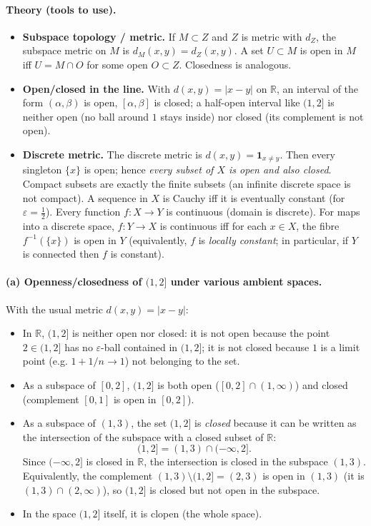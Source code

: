 \documentclass[12pt,a4paper]{article}
\theoremstyle{plain}
\theoremstyle{definition}
\theoremstyle{remark}
\theoremstyle{remark}
\begin{document}
\paragraph{Theory (tools to use).}
\begin{itemize}
	\item \textbf{Subspace topology / metric.}
	If $M\subset Z$ and $Z$ is metric with $d_Z$, the subspace metric on $M$ is
	$d_M(x,y)=d_Z(x,y)$. A set $U\subset M$ is open in $M$ iff $U=M\cap O$ for some open $O\subset Z$.
	Closedness is analogous.
	
	\item \textbf{Open/closed in the line.}
	With $d(x,y)=|x-y|$ on $\mathbb R$, an interval of the form $(\alpha,\beta)$ is open, $[\alpha,\beta]$ is closed; a half-open interval like $(1,2]$ is neither open (no ball around $1$ stays inside) nor closed (its complement is not open).
	
	\item \textbf{Discrete metric.}
	The discrete metric is $d(x,y)=\mathbf 1_{x\ne y}$. Then every singleton $\{x\}$ is open; hence \emph{every subset of $X$ is open and also closed}. Compact subsets are exactly the finite subsets (an infinite discrete space is not compact). A sequence in $X$ is Cauchy iff it is eventually constant (for $\varepsilon=\tfrac12$). Every function $f:X\to Y$ is continuous (domain is discrete). For maps into a discrete space, $f:Y\to X$ is continuous iff for each $x\in X$, the fibre $f^{-1}(\{x\})$ is open in $Y$ (equivalently, $f$ is \emph{locally constant}; in particular, if $Y$ is connected then $f$ is constant).
\end{itemize}

\paragraph{(a) Openness/closedness of $(1,2]$ under various ambient spaces.}
With the usual metric $d(x,y)=|x-y|$:
\begin{itemize}
\item In $\mathbb R$, $(1,2]$ is neither open nor closed:
it is not open because the point $2\in(1,2]$ has no $\varepsilon$-ball contained in $(1,2]$;
it is not closed because $1$ is a limit point (e.g. $1+1/n\to1$) not belonging to the set.

	\item As a subspace of $[0,2]$, $(1,2]$ is both open ($[0,2]\cap (1,\infty)$) and closed (complement $[0,1]$ is open in $[0,2]$).
\item As a subspace of $(1,3)$, the set $(1,2]$ is \emph{closed} because it can be written as the
intersection of the subspace with a closed subset of $\mathbb{R}$:
\[
(1,2]=(1,3)\cap(-\infty,2].
\]
Since $(-\infty,2]$ is closed in $\mathbb{R}$, the intersection is closed in the subspace $(1,3)$.
Equivalently, the complement $(1,3)\setminus(1,2]=(2,3)$ is open in $(1,3)$ (it is $(1,3)\cap(2,\infty)$),
so $(1,2]$ is closed but not open in the subspace.

	\item In the space $(1,2]$ itself, it is clopen (the whole space).
\end{itemize}
\end{document}
